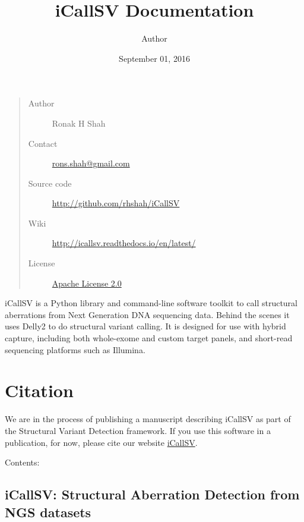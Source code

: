 \documentclass[letterpaper,10pt,english]{sphinxmanual}
\title{iCallSV Documentation}
\date{September 01, 2016}
\author{Author}
\begin{document}
\maketitle
\tableofcontents
{}\label{index::doc}

\begin{quote}\begin{description}
\item[{Author}] \leavevmode
Ronak H Shah

\item[{Contact}] \leavevmode
\href{mailto:rons.shah@gmail.com}{rons.shah@gmail.com}

\item[{Source code}] \leavevmode
\href{http://github.com/rhshah/iCallSV}{http://github.com/rhshah/iCallSV}

\item[{Wiki}] \leavevmode
\href{http://icallsv.readthedocs.io/en/latest/}{http://icallsv.readthedocs.io/en/latest/}

\item[{License}] \leavevmode
\href{http://www.apache.org/licenses/LICENSE-2.0}{Apache License 2.0}

\end{description}\end{quote}
\href{https://landscape.io/github/rhshah/iCallSV/master}{}\href{http://dx.doi.org/10.5281/zenodo.55009}{}
iCallSV is a Python library and command-line software toolkit to call structural aberrations from Next Generation DNA sequencing data. Behind the scenes it uses Delly2 to do structural variant calling. It is designed for use with hybrid capture, including both whole-exome and custom target panels, and
short-read sequencing platforms such as Illumina.


\chapter{Citation}
\label{index:citation}\label{index:icallsv-structural-aberration-detection-from-ngs-datasets}
We are in the process of publishing a manuscript describing iCallSV as part of the Structural Variant Detection framework.
If you use this software in a publication, for now, please cite our website \href{http://github.com/rhshah/iCallSV}{iCallSV}.

Contents:


\section{iCallSV: Structural Aberration Detection from NGS datasets}
\label{iCallSV::doc}\label{iCallSV:icallsv-structural-aberration-detection-from-ngs-datasets}
\end{document}
